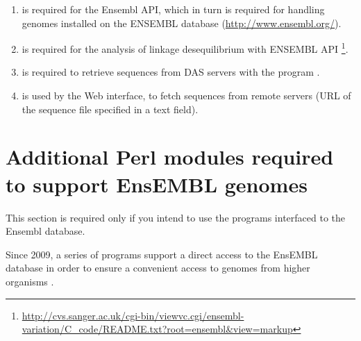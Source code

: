 \documentclass[12pt,a4paper, oneside]{scrreprt} %
\begin{document}
\begin{enumerate}
- for mysql\_config issues, specify the path to mysql\_config (adapt the path to your own installation):
\begin{verbatim}
	cd /Users/yourusername/.cpan/build/DBD-mysql-version-xxxxx
	perl Makefile.pl --mysql_config=/usr/local/mysql/bin/mysql_config 
\end{verbatim}

-then adding a soft link as follows\footnote{\url{http://www.blog.bridgeutopiaweb.com/post/how-to-fix-mysql-load-issues-on-mac-os-x/}}:
\begin{verbatim}
sudo ln -s /usr/local/mysql/lib/libmysqlclient.18.dylib /usr/lib/libmysqlclient.18.dylib
\end{verbatim}
 - finish with 
\begin{verbatim}
make
make test
make install
\end{verbatim}

\item {} is required for the Ensembl API, which in
  turn is required for handling genomes installed on the ENSEMBL
  database (\url{http://www.ensembl.org/}).

\item {} is required for the analysis of linkage
  desequilibrium with ENSEMBL API
  \footnote{\url{http://cvs.sanger.ac.uk/cgi-bin/viewvc.cgi/ensembl-variation/C\_code/README.txt?root=ensembl&view=markup}}.

\item {} is required to retrieve sequences from DAS
  servers with the program .

\item {} is used by the Web interface, to fetch
  sequences from remote servers (URL of the sequence file specified in
  a text field).

\end{enumerate}

\section{Additional Perl modules required to support EnsEMBL genomes}
\label{sect:ensembl_libraries}

This section is required only if you intend to use the \RSAT programs
interfaced to the Ensembl database. 

Since 2009, a series of \RSAT programs support a direct access to the
EnsEMBL database in order to ensure a convenient access to genomes
from higher organisms \cite{Sand:2009}.
\end{document}
